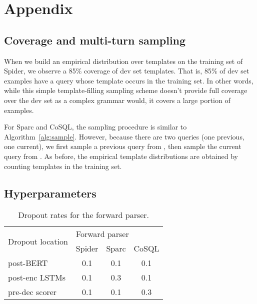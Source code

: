 \documentclass[11pt,a4paper]{article}
\begin{document}





\clearpage
\appendix




\section{Appendix}
\label{sec:appendix}

\subsection{Coverage and multi-turn sampling}
\label{app:sampling}

When we build an empirical distribution over templates on the training set of Spider, we observe a 85\% coverage of dev set templates.
That is, 85\% of dev set examples have a query whose template occurs in the training set.
In other words, while this simple template-filling sampling scheme doesn't provide full coverage over the dev set as a complex grammar would, it covers a large portion of examples.

For Sparc and CoSQL, the sampling procedure is similar to Algorithm~\ref{alg:sample}.
However, because there are two queries (one previous, one current), we first sample a previous query  from , then sample the current query  from .
As before, the empirical template distributions are obtained by counting templates in the training set.






\subsection{Hyperparameters}
\label{app:hyperparameters}

\begin{table}[ht]
\centering
\begin{tabular}{@{}lccc@{}}
\toprule
\multirow{2}{*}{Dropout location} & \multicolumn{3}{l}{Forward parser} \\ \cmidrule(l){2-4} 
                                  & Spider     & Sparc     & CoSQL     \\ \midrule
post-BERT                         & 0.1        & 0.1       & 0.1       \\
post-enc LSTMs                & 0.1        & 0.3       & 0.1       \\
pre-dec scorer                & 0.1        & 0.1       & 0.3       \\ \bottomrule
\end{tabular}
\caption{Dropout rates for the forward parser.}
\label{tab:dropout-forward}
\end{table}
\end{document}

